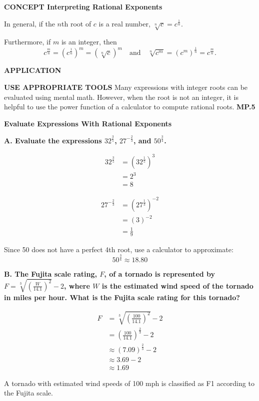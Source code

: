 \documentclass{article}
\newenvironment{concept-box}{}{}
\newenvironment{example}[1]{}{}
\newcommand{\placeholder}[2]{}
\begin{document}
\begin{concept-box}
\textbf{CONCEPT Interpreting Rational Exponents}

In general, if the $n$th root of $c$ is a real number, $\sqrt[n]{c} = c^{\frac{1}{n}}$.

Furthermore, if $m$ is an integer, then
\[ c^{\frac{m}{n}} = (c^{\frac{1}{n}})^m = (\sqrt[n]{c})^m \quad \text{and} \quad \sqrt[n]{c^m} = (c^m)^{\frac{1}{n}} = c^{\frac{m}{n}}. \]
\end{concept-box}

\textbf{APPLICATION}

\textbf{USE APPROPRIATE TOOLS}
Many expressions with integer roots can be evaluated using mental math. However, when the root is not an integer, it is helpful to use the power function of a calculator to compute rational roots. \textbf{MP.5}

\begin{example}{3}
\textbf{Evaluate Expressions With Rational Exponents}

\textbf{A. Evaluate the expressions $32^{\frac{3}{5}}$, $27^{-\frac{2}{3}}$, and $50^{\frac{3}{4}}$.}

\begin{align*}
32^{\frac{3}{5}} &= (32^{\frac{1}{5}})^3 \\
&= 2^3 \\
&= 8
\end{align*}

\begin{align*}
27^{-\frac{2}{3}} &= (27^{\frac{1}{3}})^{-2} \\
&= (3)^{-2} \\
&= \frac{1}{9}
\end{align*}

Since 50 does not have a perfect 4th root, use a calculator to approximate:
\[ 50^{\frac{3}{4}} \approx 18.80 \]

\textbf{B. The Fujita scale rating, $F$, of a tornado is represented by $F = \sqrt[3]{\left(\frac{W}{14.1}\right)^2} - 2$, where $W$ is the estimated wind speed of the tornado in miles per hour. What is the Fujita scale rating for this tornado?}

\placeholder{photo}{A tornado on a road, with label 'Wind speed estimated at 100 mph'}

\begin{align*}
F &= \sqrt[3]{\left(\frac{100}{14.1}\right)^2} - 2 \\
&= \left(\frac{100}{14.1}\right)^{\frac{2}{3}} - 2 \\
&\approx (7.09)^{\frac{2}{3}} - 2 \\
&\approx 3.69 - 2 \\
&\approx 1.69
\end{align*}

A tornado with estimated wind speeds of 100 mph is classified as F1 according to the Fujita scale.
\end{example}
\end{document}
